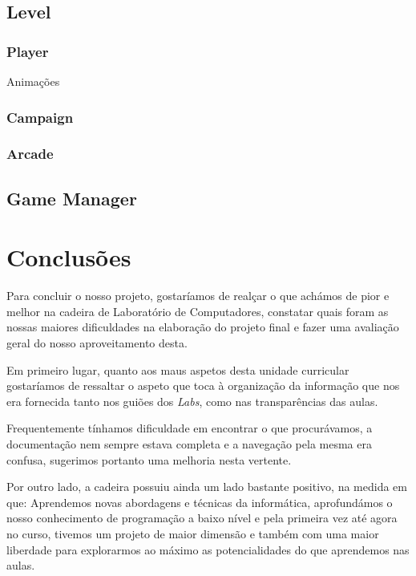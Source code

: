 \documentclass{report}
\begin{document}
\section{Level}

\subsection{Player}

Animações

\subsection{Campaign}

\subsection{Arcade}

\section{Game Manager}

\section{}


\chapter{Conclusões}

Para concluir o nosso projeto, gostaríamos de realçar o que achámos de pior e melhor na cadeira de Laboratório de Computadores, constatar quais foram as nossas maiores dificuldades na elaboração do projeto final e fazer uma avaliação geral do nosso aproveitamento desta.

Em primeiro lugar, quanto aos maus aspetos desta unidade curricular gostaríamos de ressaltar o aspeto que toca à organização da informação que nos era fornecida tanto nos guiões dos \textit{Labs}, como nas transparências das aulas. 

Frequentemente tínhamos dificuldade em encontrar o que procurávamos, a documentação nem sempre estava completa e a navegação pela mesma era confusa, sugerimos portanto uma melhoria nesta vertente.

Por outro lado, a cadeira possuiu ainda um lado bastante positivo, na medida em que: Aprendemos novas abordagens e técnicas da informática, aprofundámos o nosso conhecimento de programação a baixo nível e pela primeira vez até agora no curso, tivemos um projeto de maior dimensão e também com uma maior liberdade para explorarmos ao máximo as potencialidades do que aprendemos nas aulas.
\end{document}
